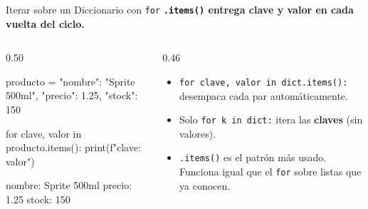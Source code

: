 \documentclass[aspectratio=169, 11pt]{beamer}
\begin{document}
\begin{frame}[fragile,shrink=30]{Iterar sobre un Diccionario con \texttt{for}}
  \vspace{-6pt}
  {\small\color{arcaDark}\bfseries
    \texttt{.items()} entrega clave y valor en cada vuelta del ciclo.}

  \vspace{4pt}
  \begin{columns}[T]
    \begin{column}{0.50\textwidth}
      \begin{pyblock}
producto = {
    "nombre": "Sprite 500ml",
    "precio": 1.25,
    "stock": 150
}

for clave, valor in producto.items():
    print(f"{clave}: {valor}")
      \end{pyblock}
      \vspace{-2pt}
      \begin{outputblock}
nombre: Sprite 500ml
precio: 1.25
stock: 150
      \end{outputblock}
    \end{column}

    \begin{column}{0.46\textwidth}
      \vspace{2pt}
      {\scriptsize\color{textMuted}
      \begin{itemize}\setlength{\itemsep}{4pt}
        \item[{\color{arcaRed}\scriptsize\faArrowRight}]
          \texttt{for clave, valor in dict.items():}
          desempaca cada par automáticamente.
        \item[{\color{arcaRed}\scriptsize\faArrowRight}]
          Solo \texttt{for k in dict:} itera
          las \textbf{claves} (sin valores).
        \item[{\color{arcaRed}\scriptsize\faLightbulb}]
          \texttt{.items()} es el patrón más usado.
          Funciona igual que el \texttt{for}
          sobre listas que ya conocen.
      \end{itemize}
      }
    \end{column}
  \end{columns}
\end{frame}
\end{document}
